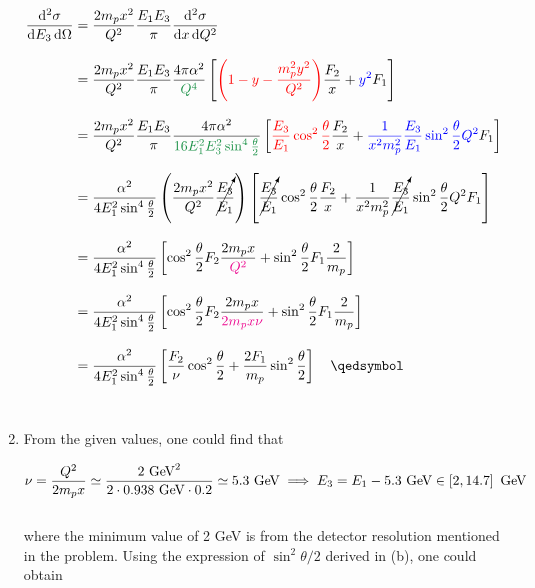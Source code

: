 \begin{solution}
\begin{enumerate}[label=(\alph*)]
            \begin{align*}
                \frac{\dif^2 \sigma}{\dif E_3 \dif \Omega} &=  \frac{2m_p x^2}{Q^2} \frac{E_1E_3}{\pi} \frac{\dif^2 \sigma}{\dif x \dif Q^2} \\[0.12in]
                &= \frac{2m_p x^2}{Q^2} \frac{E_1E_3}{\pi} \frac{4\pi\alpha^2}{\color{pinegreen} Q^4} \left[  { \color{red} \left( 1-y-\frac{m_p^2 y^2}{Q^2} \right)} \frac{F_2}{x} + {\color{blue} y^2} F_1 \right] \\[0.12in]
                &=  \frac{2m_p x^2}{Q^2} \frac{E_1E_3}{\pi} \frac{4\pi\alpha^2}{\color{pinegreen} 16 E_1^2 E_3^2 \sin^4 \halftheta} \left[  {\color{red} \frac{E_3}{E_1} \cos^2 \halftheta} \frac{F_2}{x} + {\color{blue} \frac{1}{x^2 m_p^2} \frac{E_3}{E_1} \sin^2\halftheta  Q^2 }F_1 \right] \\[0.12in]
                &= \frac{\alpha^2}{4E_1^2 \sin^4 \halftheta} \left( \frac{2m_p x^2}{Q^2} \cancelto{}{\frac{E_3}{E_1}} \right)\left[   \cancelto{}{\frac{E_3}{E_1}} \cos^2 \halftheta  \frac{F_2}{x} +   \frac{1}{x^2 m_p^2} \cancelto{}{\frac{E_3}{E_1}} \sin^2\halftheta  Q^2 F_1 \right] \\[0.12in]
                &= \frac{\alpha^2}{4E_1^2 \sin^4 \halftheta}  \left[     \cos^2 \halftheta  F_2 \frac{2 m_p x}{ \color{magenta} Q^2} +     \sin^2\halftheta    F_1 \frac{2}{m_p} \right] \\[0.12in]
                &= \frac{\alpha^2}{4E_1^2 \sin^4 \halftheta}  \left[     \cos^2 \halftheta  F_2 \frac{2 m_p x}{ \color{magenta} 2 m_p x \nu} +     \sin^2\halftheta    F_1 \frac{2}{m_p} \right] \\[0.12in]
                &=  \frac{\alpha^2}{4E_1^2 \sin^4 \halftheta} \left[ \frac{F_2}{\nu}\cos^2\halftheta + \frac{2F_1}{m_p} \sin^2 \halftheta \right] \qed
            \end{align*}\\
        \item From the given values, one could find that 
        
            \begin{align*}
                \nu = \frac{Q^2}{2m_p x} \simeq \frac{2 \text{ GeV}^2}{2 \cdot 0.938 \text{ GeV} \cdot 0.2} \simeq 5.3 \text{ GeV} \implies E_3 = E_1 - 5.3 \text{ GeV} \in \left[ 2,14.7 \right] \text{ GeV}
            \end{align*}\\
            where the minimum value of 2 GeV is from the detector resolution mentioned in the problem. Using the expression of $\sin^2 \theta/2$ derived in (b), one could obtain 


\end{enumerate}
\end{solution}
